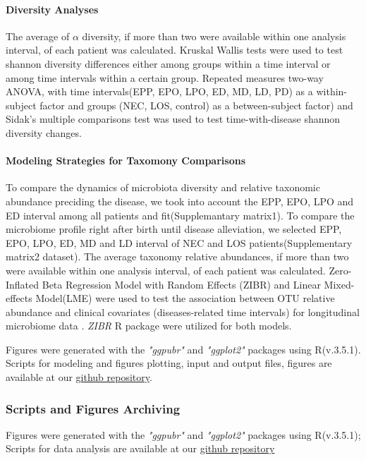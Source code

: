 \documentclass[fleqn,10pt,lineno]{wlpeerj} %
\begin{document}
      \paragraph{Diversity Analyses}
      The average of $\alpha$ diversity, if more than two were available within one analysis interval, of each patient was calculated. Kruskal Wallis tests were used to test shannon diversity differences either among groups within a time interval or among time intervals within a certain group. Repeated measures two-way ANOVA, with time intervals(EPP, EPO, LPO, ED, MD, LD, PD) as a within-subject factor and groups (NEC, LOS, control) as a between-subject factor) and Sidak's multiple comparisons test was used to test time-with-disease shannon diversity changes.
      \paragraph*{Modeling Strategies for Taxomony Comparisons}
      To compare the dynamics of microbiota diversity and relative taxonomic abundance preciding the disease, we took into account the EPP, EPO, LPO and ED interval among all patients and fit(Supplemantary matrix1).
      To compare the microbiome profile right after birth until disease alleviation, we selected EPP, EPO, LPO, ED, MD and LD interval of NEC and LOS patients(Supplementary matrix2 dataset).
      The average taxonomy relative abundances, if more than two were available within one analysis interval, of each patient was calculated.
      Zero-Inflated Beta Regression Model with Random Effects (ZIBR) and Linear Mixed-effects Model(LME) were used to test the association between OTU relative abundance and clinical covariates (diseases-related time intervals) for longitudinal microbiome data \citep{chen2016two}. \textit{ZIBR} R package were utilized for both models.

      \noindent
      Figures were generated with the \textit{"ggpubr"}\citep{kassambara2017ggpubr} and \textit{"ggplot2"}\citep{ggplot2} packages using R(v.3.5.1).
      Scripts for modeling and figures plotting, input and output files, figures are available at our \href{https://github.com/jiayiliujiayi/NEC-LOS-microbiota_pattern_comparison}{github repository}.

    \subsubsection*{Scripts and Figures Archiving}
    Figures were generated with the \textit{"ggpubr"}\citep{kassambara2017ggpubr} and \textit{"ggplot2"}\citep{ggplot2} packages using R(v.3.5.1); Scripts for data analysis are available at our \href{https://github.com/jiayiliujiayi/NEC-LOS-microbiota_pattern_comparison}{github repository}
\end{document}
